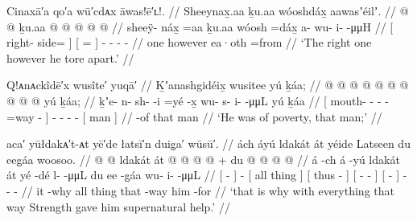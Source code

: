 \ex\label{ex:93-64-right-one-tore-apart}%
%
\begingl
	\glpreamble	Cinaxā′a qo′a wū′cdᴀx āwas!ē′ʟ!. //
	\glpreamble	Sheeynax̱.aa ḵu.aa wóoshdáx̱ aawasʼéilʼ. //
	\gla	{}  @ {} @ {} {}
		ḵu.aa
		{}  @ {} {}
		 @ {} @ {} @ {} @ {} //
	\glb	{} sheeÿ- náx̱ =aa {}
		ḵu.aa
		{} wóosh =dáx̱ {}
		a- wu- i-  -μμH //
	\glc	{}[ right- side=  {}]
		{}[  = {}]
		- - -  - //
	\gld	{}  {} one {}
		however
		{} ea·oth =from {}
		 {} {} {} {} //
	\glft	‘The right one however he tore apart.’
		//
\endgl
\xe

\ex\label{ex:93-65-he-was-of-poverty-that-man}%
%
\begingl
	\glpreamble	Q!ᴀnᴀckîdē′x wusîte′ yuqā′ //
	\glpreamble	Ḵʼanashgidéix̱ wusitee yú ḵáa;  //
	\gla	{}  @ {} @ {} @ {} @ {} @ {} @ {} {}
		 @ {} @ {} @ {} @ {}
		{} yú ḵáa; {} //
	\glb	{} ḵʼe- n- sh-  -i =yé -x̱ {}
		wu- s- i-  -μμL
		{} yú ḵáa {} //
	\glc	{}[ mouth- - -  - =way - {}]
		- - -  -
		{}[  man {}] //
	\gld	{}  {} {} {} {} {} -of {}
		 {} {} {} {}
		{} that man {} //
	\glft	‘He was of poverty, that man;’
		//
\endgl
\xe

\ex\label{ex:93-66-why-strength-helped-him}%
%
\begingl
	\glpreamble	aca′ yūłdakᴀ′t-ᴀt yē′de łatsī′n duig̣a′ wūsū′. //
	\glpreamble	ách áyú ldakát át yéide Latseen du eeg̱áa woosoo. //
	\gla	{}  @ {} {}
		 @ {}
		{} ldakát át {}
		{}  @ {} {}
		{}  @ {} @ {} @ {} {} +
		{} du  @ {} {}
		 @ {} @ {} @ {} //
	\glb	{} á -ch {}	
		á -yú
		{} ldakát át {}
		{} yé -dé {}
		{} l-  -μμL {} {}
		{} du ee -g̱áa {}
		wu- i-  -μμL //
	\glc	{}[  - {}]
		 -
		{}[ all thing {}]
		{}[ thus - {}]
		{}[ -  - \· {}]
		{}[   - {}]
		- -  - //
	\gld	{} it -why {}
		 {}
		{} all thing {}
		{} that -way {}
		{}  {} {} {} {}
		{} him {} -for {}
		 {} {} {} //
	\glft	‘that is why with everything that way Strength gave him supernatural help.’
		//
\endgl
\xe

